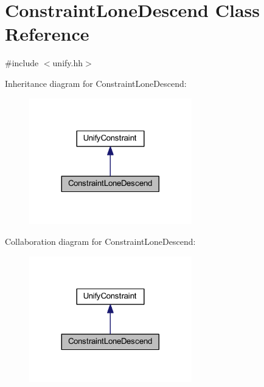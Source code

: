 \hypertarget{class_constraint_lone_descend}{}\section{Constraint\+Lone\+Descend Class Reference}
\label{class_constraint_lone_descend}


{\ttfamily \#include $<$unify.\+hh$>$}



Inheritance diagram for Constraint\+Lone\+Descend\+:
\nopagebreak
\begin{figure}[H]
\begin{center}
\leavevmode
\includegraphics[width=200pt]{class_constraint_lone_descend__inherit__graph}
\end{center}
\end{figure}


Collaboration diagram for Constraint\+Lone\+Descend\+:
\nopagebreak
\begin{figure}[H]
\begin{center}
\leavevmode
\includegraphics[width=200pt]{class_constraint_lone_descend__coll__graph}
\end{center}
\end{figure}
